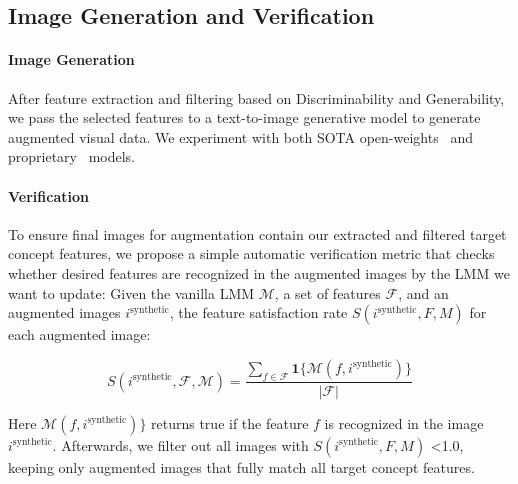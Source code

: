 
\subsection{Image Generation and Verification}

\paragraph{Image Generation}

After feature extraction and filtering based on Discriminability and Generability, we pass the selected features to a text-to-image generative model to generate augmented visual data. We experiment with both SOTA open-weights~\citep{esser2024scaling, stablediffusion3.5} and proprietary~\cite{2024RecraftV3} models.

\vspace{-0.5em}
\paragraph{Verification} To ensure final images for augmentation contain our extracted and filtered target concept features, we propose a simple automatic verification metric that checks whether desired features are recognized in the augmented images by the LMM we want to update: Given the vanilla LMM $\mathcal{M}$, a set of features $\mathcal{F}$, and %
an augmented images $i^{\text{synthetic}}$, 
the feature satisfaction rate $S(i^\text{synthetic}, F, M)$ for each augmented image:

\vspace{-0.7em}
\[
S(i^\text{synthetic}, \mathcal{F}, \mathcal{M}) = \frac{\sum_{f \in \mathcal{F}} \mathbf{1}\{ \mathcal{M}(f, i^\text{synthetic}) \}}{|\mathcal{F}|}
\]
\vspace{-0.7em}


Here $\mathcal{M}(f, i^\text{synthetic}) \}$ returns true if the feature $f$ is recognized in the image $i^\text{synthetic}$. Afterwards, we filter out all images with $S(i^\text{synthetic}, F, M)$ \textless 1.0, keeping only augmented images that fully match all target concept features.



